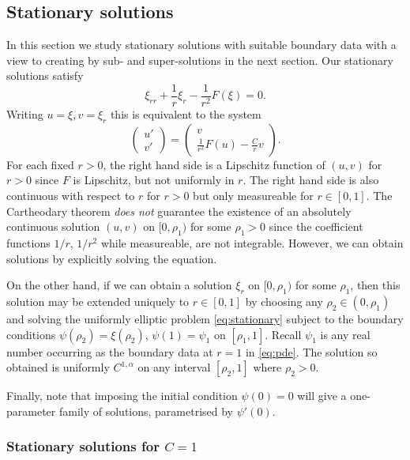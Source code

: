 \documentclass{amsart}
\begin{document}
\subsection{Stationary solutions}
\label{subsec:stationary}
In this section we study stationary solutions with suitable boundary data with a view to creating by sub- and super-solutions in the next section. Our stationary solutions satisfy
\begin{equation}
\label{eq:stationary}
\xi_{rr} + \frac{1}{r} \xi_r - \frac{1}{r^2} F(\xi)  = 0.
\end{equation}
Writing \(u = \xi, v = \xi_r\) this is equivalent to the system
\[
\begin{pmatrix}
u' \\
v'
\end{pmatrix}
=
\begin{pmatrix}
v \\
\frac{1}{r^2} F(u) - \frac{C}{r} v
\end{pmatrix}.
\]
For each fixed \(r > 0\), the right hand side is a Lipschitz function of \((u,v)\) for \(r>0\) since \(F\) is Lipschitz, but not uniformly in \(r\). The right hand side is also continuous with respect to \(r\) for \(r > 0\) but only measureable for \(r \in [0, 1]\). The Cartheodary theorem \emph{does not} guarantee the existence of an absolutely continuous solution \((u, v)\) on \([0, \rho_1)\) for some  \(\rho_1 > 0\) since the coefficient functions \(1/r\), \(1/r^2\) while measureable, are not integrable. However, we can obtain solutions by explicitly solving the equation.

On the other hand, if we can obtain a solution \(\xi_r\) on \([0,\rho_1)\) for some \(\rho_1\), then this solution may be extended uniquely to \(r \in [0, 1]\) by choosing any \(\rho_2 \in (0, \rho_1)\) and solving the uniformly elliptic problem \eqref{eq:stationary} subject to the boundary conditions \(\psi(\rho_2) = \xi(\rho_2)\), \(\psi(1) = \psi_1\) on \([\rho_1, 1]\). Recall \(\psi_1\) is any real number occurring as the boundary data at \(r=1\) in \eqref{eq:pde}. The solution so obtained is uniformly \(C^{1,\alpha}\) on any interval \([\rho_2, 1]\) where \(\rho_2 > 0\).

Finally, note that imposing the initial condition \(\psi(0) = 0\) will give a one-parameter family of solutions, parametrised by \(\psi'(0)\).

\subsubsection*{Stationary solutions for \(C=1\)}
\end{document}
